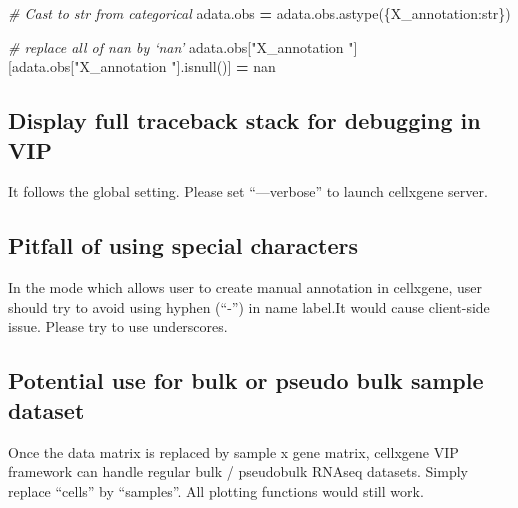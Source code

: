 \documentclass[
]{article}
\newenvironment{Shaded}{\begin{snugshade}}{\end{snugshade}}
\newcommand{\CommentTok}[1]{\textcolor[rgb]{0.56,0.35,0.01}{\textit{#1}}}
\newcommand{\NormalTok}[1]{#1}
\newcommand{\OperatorTok}[1]{\textcolor[rgb]{0.81,0.36,0.00}{\textbf{#1}}}
\newcommand{\StringTok}[1]{\textcolor[rgb]{0.31,0.60,0.02}{#1}}
\begin{document}
\begin{Shaded}
\begin{Highlighting}[]
\CommentTok{\# Cast to str from categorical}
\NormalTok{adata.obs }\OperatorTok{=}\NormalTok{ adata.obs.astype(\{}\StringTok{\textquotesingle{}X\_annotation\textquotesingle{}}\NormalTok{:}\StringTok{\textquotesingle{}str\textquotesingle{}}\NormalTok{\})}

\CommentTok{\# replace all of nan by ‘nan’}
\NormalTok{adata.obs[}\StringTok{"X\_annotation "}\NormalTok{][adata.obs[}\StringTok{"X\_annotation "}\NormalTok{].isnull()] }\OperatorTok{=} \StringTok{\textquotesingle{}nan\textquotesingle{}}
\end{Highlighting}
\end{Shaded}

\hypertarget{display-full-traceback-stack-for-debugging-in-vip}{%
\subsection{Display full traceback stack for debugging in VIP}\label{display-full-traceback-stack-for-debugging-in-vip}}

It follows the global setting. Please set ``---verbose'' to launch cellxgene server.

\hypertarget{pitfall-of-using-special-characters}{%
\subsection{Pitfall of using special characters}\label{pitfall-of-using-special-characters}}

In the mode which allows user to create manual annotation in cellxgene, user should try to avoid using hyphen (``-'') in name label.It would cause client-side issue. Please try to use underscores.

\hypertarget{potential-use-for-bulk-or-pseudo-bulk-sample-dataset}{%
\subsection{Potential use for bulk or pseudo bulk sample dataset}\label{potential-use-for-bulk-or-pseudo-bulk-sample-dataset}}

Once the data matrix is replaced by sample x gene matrix, cellxgene VIP framework can handle regular bulk / pseudobulk RNAseq datasets. Simply replace ``cells'' by ``samples''. All plotting functions would still work.
\end{document}
